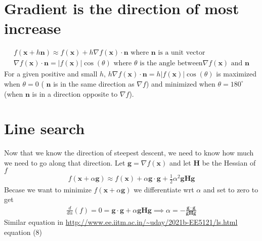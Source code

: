 \documentclass{article}
\newcommand{\ber}{\begin{eqnarray}}
\newcommand{\eer}{\end{eqnarray}}
\newcommand{\dd}[2]{\frac{d}{d{#2}}{(#1)} }
\begin{document}
\section{Gradient is the direction of most increase}
\ber
f(\pmb{x} + h\pmb{n}) \approx f(\pmb{x}) + h\nabla{f(\pmb{x})}\cdot\pmb{n} \text{ where } \pmb{n} \text{ is a unit vector} \\
\nabla{f(\pmb{x})}\cdot\pmb{n} = |f(\pmb{x})|\cos(\theta) \text{ where } \theta \text{ is the angle between} \nabla{}f(\pmb{x}) \text{ and } \pmb{n} 
\eer
For a given positive and small $h$, $h\nabla{f(\pmb{x})}\cdot\pmb{n} = h|f(\pmb{x})|\cos(\theta) $ is maximized when $\theta=0$ ( $\pmb{n}$ is in the same direction as $\nabla{f}$) and minimized when $\theta=180^{\circ}$ (when $\pmb{n}$ is in a direction opposite to $\nabla{}f$). 
\section{Line search}
Now that we know the direction of steepest descent, we need to know how much we need to go along that direction. Let $\pmb{g}=\nabla{}f(\pmb{x})$ and let $\pmb{H}$ be the Hessian of $f$
\ber
f(\pmb{x} + \alpha\pmb{g}) \approx f(\pmb{x}) + \alpha\pmb{g}\cdot\pmb{g} + \frac{1}{2}\alpha^2\pmb{g}\pmb{H}\pmb{g}
\eer
Becase we want to minimize $f(\pmb{x} + \alpha\pmb{g})$ we differentiate wrt $\alpha$ and set to zero to get
\ber
\dd{f}{\alpha} = 0 = \pmb{g}\cdot\pmb{g} + \alpha\pmb{g}\pmb{H}\pmb{g} \implies \alpha = -\frac{\pmb{g}\cdot\pmb{g}}{\pmb{g}\pmb{H}\pmb{g}}
\eer
Similar equation in \url{http://www.ee.iitm.ac.in/~uday/2021b-EE5121/ls.html} equation (8)
\end{document}
